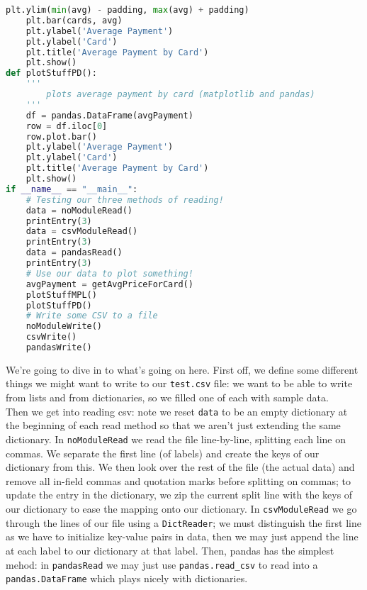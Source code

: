 \documentclass[12pt]{article}
\begin{document}
\begin{lstlisting}[language=Python]
    plt.ylim(min(avg) - padding, max(avg) + padding)
    plt.bar(cards, avg)
    plt.ylabel('Average Payment')
    plt.ylabel('Card')
    plt.title('Average Payment by Card')
    plt.show()
def plotStuffPD():
    '''
        plots average payment by card (matplotlib and pandas)
    '''
    df = pandas.DataFrame(avgPayment)
    row = df.iloc[0]
    row.plot.bar()
    plt.ylabel('Average Payment')
    plt.ylabel('Card')
    plt.title('Average Payment by Card')
    plt.show()
if __name__ == "__main__":
    # Testing our three methods of reading!
    data = noModuleRead()
    printEntry(3)
    data = csvModuleRead()
    printEntry(3)
    data = pandasRead()
    printEntry(3)
    # Use our data to plot something!
    avgPayment = getAvgPriceForCard()
    plotStuffMPL()
    plotStuffPD()
    # Write some CSV to a file
    noModuleWrite()
    csvWrite()
    pandasWrite()
\end{lstlisting}
We're going to dive in to what's going on here. First off, we define some different things we might want to write to our \texttt{test.csv} file: we want to be able to write from lists and from dictionaries, so we filled one of each with sample data.\\
Then we get into reading csv: note we reset \texttt{data} to be an empty dictionary at the beginning of each read method so that we aren't just extending the same dictionary. In \texttt{noModuleRead} we read the file line-by-line, splitting each line on commas. We separate the first line (of labels) and create the keys of our dictionary from this. We then look over the rest of the file (the actual data) and remove all in-field commas and quotation marks before splitting on commas; to update the entry in the dictionary, we zip the current split line with the keys of our dictionary to ease the mapping onto our dictionary. In \texttt{csvModuleRead} we go through the lines of our file using a \texttt{DictReader}; we must distinguish the first line as we have to initialize key-value pairs in data, then we may just append the line at each label to our dictionary at that label. Then, pandas has the simplest mehod: in \texttt{pandasRead} we may just use \texttt{pandas.read\_csv} to read into a \texttt{pandas.DataFrame} which plays nicely with dictionaries.\\
\end{document}
